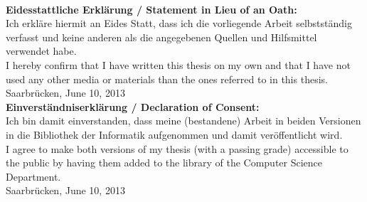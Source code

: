 \clearpage
\thispagestyle{empty}
~
\vfill
\newpage
\begin{flushleft}
{
        \small
%
	\textbf{Eidesstattliche Erkl\"arung / Statement in Lieu of an Oath:}\\
	Ich erkl\"are hiermit an Eides Statt, dass ich die vorliegende Arbeit selbstst\"andig verfasst und keine
anderen als die angegebenen Quellen und Hilfsmittel verwendet habe.\\
	I hereby confirm that I have written this thesis on my own and that I have not used any other media or
materials than the ones referred to in this thesis.\\[\baselineskip]
	Saarbr\"ucken, June 10, 2013\\
\vspace{4cm}
	\textbf{Einverst\"andniserkl\"arung / Declaration of Consent:}\\
	Ich bin damit einverstanden, dass meine (bestandene) Arbeit in beiden Versionen in die Bibliothek der
Informatik aufgenommen und damit ver\"offentlicht wird.\\
	I agree to make both versions of my thesis (with a passing grade) accessible to the public by having
them added to the library of the Computer Science Department.\\[\baselineskip]
	Saarbr\"ucken, June 10, 2013
\vspace{3cm}
}
\end{flushleft}
\clearpage
\thispagestyle{empty}
~
\vfill


